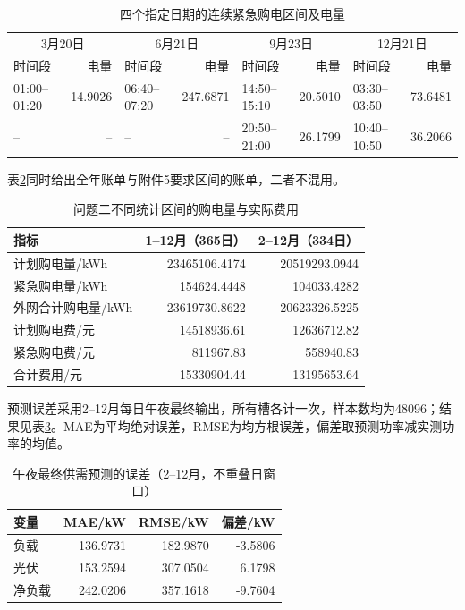 \begin{table}[H]\centering\small
\caption{四个指定日期的连续紧急购电区间及电量}\label{tab:q2-emergency}
\setlength{\tabcolsep}{3pt}\begin{tabular}{lrlrlrlr}\toprule
\multicolumn{2}{c}{3月20日}&\multicolumn{2}{c}{6月21日}&\multicolumn{2}{c}{9月23日}&\multicolumn{2}{c}{12月21日}\\
时间段&电量&时间段&电量&时间段&电量&时间段&电量\\\midrule
01:00--01:20&14.9026&06:40--07:20&247.6871&14:50--15:10&20.5010&03:30--03:50&73.6481\\
--&--&--&--&20:50--21:00&26.1799&10:40--10:50&36.2066\\
\bottomrule\end{tabular}\end{table}
表\ref{tab:q2-annual}同时给出全年账单与附件5要求区间的账单，二者不混用。
\begin{table}[H]\centering\small
\caption{问题二不同统计区间的购电量与实际费用}\label{tab:q2-annual}
\begin{tabular}{lrr}\toprule 指标&1--12月（365日）&2--12月（334日）\\\midrule
计划购电量/kWh&23465106.4174&20519293.0944\\
紧急购电量/kWh&154624.4448&104033.4282\\
外网合计购电量/kWh&23619730.8622&20623326.5225\\
计划购电费/元&14518936.61&12636712.82\\
紧急购电费/元&811967.83&558940.83\\
合计费用/元&15330904.44&13195653.64\\
\bottomrule\end{tabular}\end{table}
预测误差采用2--12月每日午夜最终输出，所有槽各计一次，样本数均为48096；结果见表\ref{tab:q2-prediction}。MAE为平均绝对误差，RMSE为均方根误差，偏差取预测功率减实测功率的均值。
\begin{table}[H]\centering\small
\caption{午夜最终供需预测的误差（2--12月，不重叠日窗口）}\label{tab:q2-prediction}
\begin{tabular}{lrrr}\toprule 变量&MAE/kW&RMSE/kW&偏差/kW\\\midrule
负载&136.9731&182.9870&-3.5806\\
光伏&153.2594&307.0504&6.1798\\
净负载&242.0206&357.1618&-9.7604\\
\bottomrule\end{tabular}\end{table}
